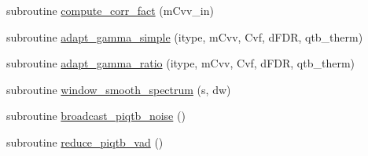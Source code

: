 \begin{DoxyCompactItemize}
subroutine \hyperlink{classqtb_ae3f6764883242093e065a6c9d2fb8a85}{compute\-\_\-corr\-\_\-fact} (m\-Cvv\-\_\-in)
\item 
subroutine \hyperlink{classqtb_a234b339ddfd78c77dcc89f09c5897639}{adapt\-\_\-gamma\-\_\-simple} (itype, m\-Cvv, Cvf, d\-F\-D\-R, qtb\-\_\-therm)
\item 
subroutine \hyperlink{classqtb_a97afb234fbbd9e9466431147e998ec33}{adapt\-\_\-gamma\-\_\-ratio} (itype, m\-Cvv, Cvf, d\-F\-D\-R, qtb\-\_\-therm)
\item 
subroutine \hyperlink{classqtb_a51e5e38dbbb20343cadccb3de9705903}{window\-\_\-smooth\-\_\-spectrum} (s, dw)
\item 
subroutine \hyperlink{classqtb_aa22488ea9a65a1c8fe9c6caff9e9c99c}{broadcast\-\_\-piqtb\-\_\-noise} ()
\item 
subroutine \hyperlink{classqtb_afa830ad0bf6560491dbb417d0517998b}{reduce\-\_\-piqtb\-\_\-vad} ()
\end{DoxyCompactItemize}
